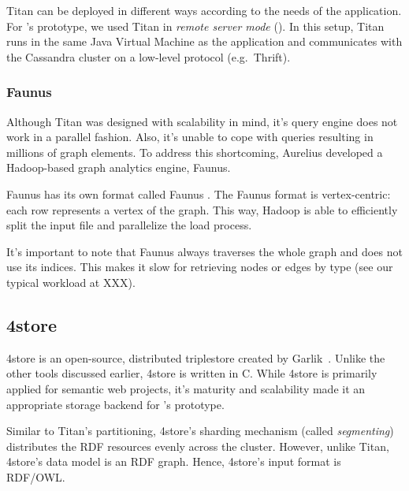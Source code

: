Titan can be deployed in different ways according to the needs of the application. For \iqd's prototype, we used Titan in \textit{remote server mode} (). In this setup, Titan runs in the same Java Virtual Machine as the application and communicates with the Cassandra cluster on a low-level protocol (e.g.\ Thrift).


\subsubsection{Faunus}

Although Titan was designed with scalability in mind, it's query engine does not work in a parallel fashion. Also, it's unable to cope with queries resulting in millions of graph elements. To address this shortcoming, Aurelius developed a Hadoop-based graph analytics engine, Faunus. %

Faunus has its own format called Faunus \graphson{}. The Faunus \graphson{} format is vertex-centric: each row represents a vertex of the graph. This way, Hadoop is able to efficiently split the input file and parallelize the load process.


It's important to note that Faunus always traverses the whole graph and does not use its indices. This makes it slow for retrieving nodes or edges by type (see our typical workload at XXX).

\subsection{4store}

4store is an open-source, distributed triplestore created by Garlik~\cite{4store}. Unlike the other tools discussed earlier, 4store is written in C. While 4store is primarily applied for semantic web projects, it's maturity and scalability made it an appropriate storage backend for \iqd's prototype.

Similar to Titan's partitioning, 4store's sharding mechanism (called \emph{segmenting}) distributes the RDF resources evenly across the cluster. However, unlike Titan, 4store's data model is an RDF graph. Hence, 4store's input format is RDF/OWL.


